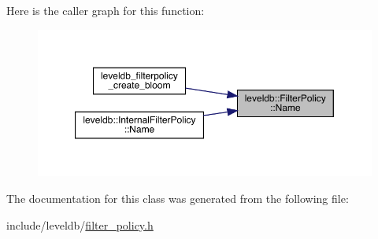Here is the caller graph for this function\+:
\nopagebreak
\begin{figure}[H]
\begin{center}
\leavevmode
\includegraphics[width=350pt]{classleveldb_1_1_filter_policy_afd5e951892a2e740f186c0658913ea1b_icgraph}
\end{center}
\end{figure}


The documentation for this class was generated from the following file\+:\begin{DoxyCompactItemize}
\item 
include/leveldb/\mbox{\hyperlink{filter__policy_8h}{filter\+\_\+policy.\+h}}\end{DoxyCompactItemize}
